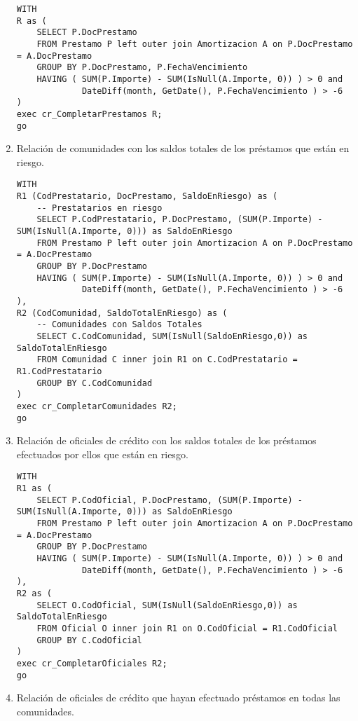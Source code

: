 \begin{enumerate}
\begin{verbatim}
WITH
R as (
    SELECT P.DocPrestamo
    FROM Prestamo P left outer join Amortizacion A on P.DocPrestamo = A.DocPrestamo
    GROUP BY P.DocPrestamo, P.FechaVencimiento
    HAVING ( SUM(P.Importe) - SUM(IsNull(A.Importe, 0)) ) > 0 and
             DateDiff(month, GetDate(), P.FechaVencimiento ) > -6
)
exec cr_CompletarPrestamos R;
go
\end{verbatim}

\item Relación de comunidades con los saldos totales de los préstamos que están en riesgo.

\begin{verbatim}
WITH
R1 (CodPrestatario, DocPrestamo, SaldoEnRiesgo) as (
    -- Prestatarios en riesgo
    SELECT P.CodPrestatario, P.DocPrestamo, (SUM(P.Importe) - SUM(IsNull(A.Importe, 0))) as SaldoEnRiesgo
    FROM Prestamo P left outer join Amortizacion A on P.DocPrestamo = A.DocPrestamo
    GROUP BY P.DocPrestamo
    HAVING ( SUM(P.Importe) - SUM(IsNull(A.Importe, 0)) ) > 0 and
             DateDiff(month, GetDate(), P.FechaVencimiento ) > -6
),
R2 (CodComunidad, SaldoTotalEnRiesgo) as (
    -- Comunidades con Saldos Totales
    SELECT C.CodComunidad, SUM(IsNull(SaldoEnRiesgo,0)) as SaldoTotalEnRiesgo
    FROM Comunidad C inner join R1 on C.CodPrestatario = R1.CodPrestatario
    GROUP BY C.CodComunidad
)
exec cr_CompletarComunidades R2;
go
\end{verbatim}


\item Relación de oficiales de crédito con los saldos totales de los préstamos
efectuados por ellos que están en riesgo.

\begin{verbatim}
WITH
R1 as (
    SELECT P.CodOficial, P.DocPrestamo, (SUM(P.Importe) - SUM(IsNull(A.Importe, 0))) as SaldoEnRiesgo
    FROM Prestamo P left outer join Amortizacion A on P.DocPrestamo = A.DocPrestamo
    GROUP BY P.DocPrestamo
    HAVING ( SUM(P.Importe) - SUM(IsNull(A.Importe, 0)) ) > 0 and
             DateDiff(month, GetDate(), P.FechaVencimiento ) > -6
),
R2 as (
    SELECT O.CodOficial, SUM(IsNull(SaldoEnRiesgo,0)) as SaldoTotalEnRiesgo
    FROM Oficial O inner join R1 on O.CodOficial = R1.CodOficial
    GROUP BY C.CodOficial
)
exec cr_CompletarOficiales R2;
go
\end{verbatim}

\item Relación de oficiales de crédito que hayan efectuado préstamos en todas las
comunidades.


\end{enumerate}
